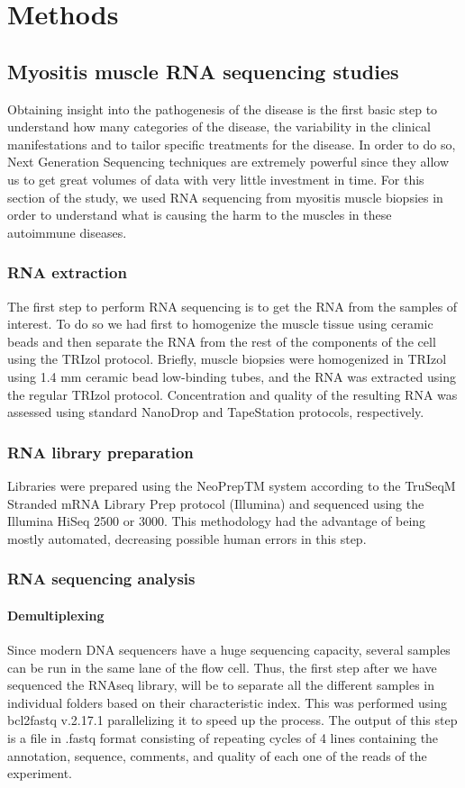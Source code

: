 \chapter{Methods}

\section{Myositis muscle RNA sequencing studies}
Obtaining insight into the pathogenesis of the disease is the first basic step to understand how many categories of the disease, the variability in the clinical manifestations and to tailor specific treatments for the disease. In order to do so, Next Generation Sequencing techniques are extremely powerful since they allow us to get great volumes of data with very little investment in time. For this section of the study, we used RNA sequencing from myositis muscle biopsies in order to understand what is causing the harm to the muscles in these autoimmune diseases.

\subsection{RNA extraction}
The first step to perform RNA sequencing is to get the RNA from the samples of interest. To do so we had first to homogenize the muscle tissue using ceramic beads and then separate the RNA from the rest of the components of the cell using the TRIzol protocol. Briefly, muscle biopsies were homogenized in TRIzol using 1.4 mm ceramic bead low-binding tubes, and the RNA was extracted using the regular TRIzol protocol. Concentration and quality of the resulting RNA was assessed using standard NanoDrop and TapeStation protocols, respectively.

\subsection{RNA library preparation}
Libraries were prepared using the NeoPrepTM system according to the TruSeqM Stranded mRNA Library Prep protocol (Illumina) and sequenced using the Illumina HiSeq 2500 or 3000. This methodology had the advantage of being mostly automated, decreasing possible human errors in this step.

\subsection{RNA sequencing analysis}
\subsubsection{Demultiplexing}
Since modern DNA sequencers have a huge sequencing capacity, several samples can be run in the same lane of the flow cell. Thus, the first step after we have sequenced the RNAseq library, will be to separate all the different samples in individual folders based on their characteristic index. This was performed using bcl2fastq v.2.17.1 parallelizing it to speed up the process. The output of this step is a file in .fastq format consisting of repeating cycles of 4 lines containing the annotation, sequence, comments, and quality of each one of the reads of the experiment.


